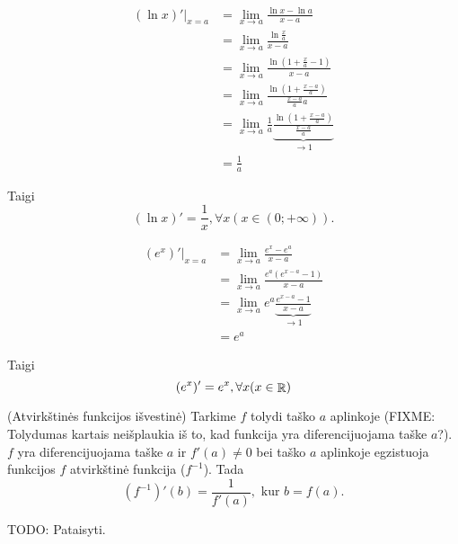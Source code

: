 \begin{exmp}
  \begin{align*}
    (\ln x)'|_{x = a}
    &= \lim _{x \to a} \frac{\ln x - \ln a}{x - a} \\
    &= \lim _{x \to a} \frac{\ln \frac{x}{a}}{x - a} \\
    &= \lim _{x \to a} 
      \frac{\ln \left( 1 + \frac{x}{a} - 1 \right)}{x - a} \\
    &= \lim _{x \to a} 
      \frac{\ln \left( 1 + \frac{x - a}{a} \right)}{\frac{x - a}{a} a} \\
    &= \lim _{x \to a} 
      \frac{1}{a}
      \underbrace{
        \frac{\ln \left( 1 + \frac{x - a}{a} \right)}{\frac{x - a}{a}}
        }_{\to 1} \\
    &= \frac{1}{a}
  \end{align*}

  Taigi
  \begin{equation*}
    (\ln x)' = \frac{1}{x}, \forall x (x \in (0; +\infty)).
  \end{equation*}
\end{exmp}

\begin{exmp}
  \begin{align*}
    (e^{x})'|_{x = a} 
    &= \lim _{x \to a} \frac{e^{x} - e^{a}}{x - a} \\
    &= \lim _{x \to a} \frac{e^{a} (e^{x-a} - 1)}{x - a} \\
    &= \lim _{x \to a} e^{a}
      \underbrace{\frac{e^{x - a} - 1}{x - a}}_{\to 1} \\
    &= e^{a}
  \end{align*}

  Taigi
  \begin{equation*}
    (e^{x})' = e^{x}, \forall x (x \in \mathop{\mathbb{R}})
  \end{equation*}
\end{exmp}

\begin{prop}
  (Atvirkštinės funkcijos išvestinė) Tarkime $f$ tolydi taško $a$ 
  aplinkoje (FIXME: Tolydumas kartais neišplaukia iš to, kad funkcija
  yra diferencijuojama taške $a$?). $f$ yra diferencijuojama taške 
  $a$ ir $f'(a) \neq 0$ bei taško $a$ aplinkoje egzistuoja funkcijos
  $f$ atvirkštinė funkcija ($f^{-1}$). Tada
  \begin{equation*}
    (f^{-1})'(b) = \frac{1}{f'(a)}, \text{ kur } b = f(a).
  \end{equation*}

  TODO: Pataisyti.
\end{prop}


